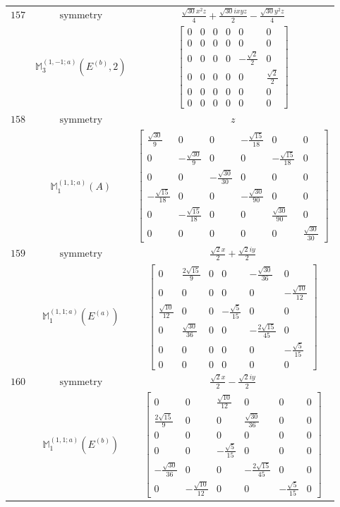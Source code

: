 \documentclass[fleqn,8pt,landscape]{jsarticle}
\begin{document}
\begin{longtable}{ccc}
$ 157 $ & $ \text{symmetry} $ & $ \frac{\sqrt{30} x^{2} z}{4} + \frac{\sqrt{30} i x y z}{2} - \frac{\sqrt{30} y^{2} z}{4} $ \\
$  $ & $ \mathbb{M}_{3}^{(1,-1;a)}(E^{(b)},2) $ & $ \begin{bmatrix} 0 & 0 & 0 & 0 & 0 & 0 \\ 0 & 0 & 0 & 0 & 0 & 0 \\ 0 & 0 & 0 & 0 & - \frac{\sqrt{2}}{2} & 0 \\ 0 & 0 & 0 & 0 & 0 & \frac{\sqrt{2}}{2} \\ 0 & 0 & 0 & 0 & 0 & 0 \\ 0 & 0 & 0 & 0 & 0 & 0 \end{bmatrix} $ \\ \hline
$ 158 $ & $ \text{symmetry} $ & $ z $ \\
$  $ & $ \mathbb{M}_{1}^{(1,1;a)}(A) $ & $ \begin{bmatrix} \frac{\sqrt{30}}{9} & 0 & 0 & - \frac{\sqrt{15}}{18} & 0 & 0 \\ 0 & - \frac{\sqrt{30}}{9} & 0 & 0 & - \frac{\sqrt{15}}{18} & 0 \\ 0 & 0 & - \frac{\sqrt{30}}{30} & 0 & 0 & 0 \\ - \frac{\sqrt{15}}{18} & 0 & 0 & - \frac{\sqrt{30}}{90} & 0 & 0 \\ 0 & - \frac{\sqrt{15}}{18} & 0 & 0 & \frac{\sqrt{30}}{90} & 0 \\ 0 & 0 & 0 & 0 & 0 & \frac{\sqrt{30}}{30} \end{bmatrix} $ \\ \hline
$ 159 $ & $ \text{symmetry} $ & $ \frac{\sqrt{2} x}{2} + \frac{\sqrt{2} i y}{2} $ \\
$  $ & $ \mathbb{M}_{1}^{(1,1;a)}(E^{(a)}) $ & $ \begin{bmatrix} 0 & \frac{2 \sqrt{15}}{9} & 0 & 0 & - \frac{\sqrt{30}}{36} & 0 \\ 0 & 0 & 0 & 0 & 0 & - \frac{\sqrt{10}}{12} \\ \frac{\sqrt{10}}{12} & 0 & 0 & - \frac{\sqrt{5}}{15} & 0 & 0 \\ 0 & \frac{\sqrt{30}}{36} & 0 & 0 & - \frac{2 \sqrt{15}}{45} & 0 \\ 0 & 0 & 0 & 0 & 0 & - \frac{\sqrt{5}}{15} \\ 0 & 0 & 0 & 0 & 0 & 0 \end{bmatrix} $ \\ \hline
$ 160 $ & $ \text{symmetry} $ & $ \frac{\sqrt{2} x}{2} - \frac{\sqrt{2} i y}{2} $ \\
$  $ & $ \mathbb{M}_{1}^{(1,1;a)}(E^{(b)}) $ & $ \begin{bmatrix} 0 & 0 & \frac{\sqrt{10}}{12} & 0 & 0 & 0 \\ \frac{2 \sqrt{15}}{9} & 0 & 0 & \frac{\sqrt{30}}{36} & 0 & 0 \\ 0 & 0 & 0 & 0 & 0 & 0 \\ 0 & 0 & - \frac{\sqrt{5}}{15} & 0 & 0 & 0 \\ - \frac{\sqrt{30}}{36} & 0 & 0 & - \frac{2 \sqrt{15}}{45} & 0 & 0 \\ 0 & - \frac{\sqrt{10}}{12} & 0 & 0 & - \frac{\sqrt{5}}{15} & 0 \end{bmatrix} $ \\ \hline
\end{longtable}
\end{document}
